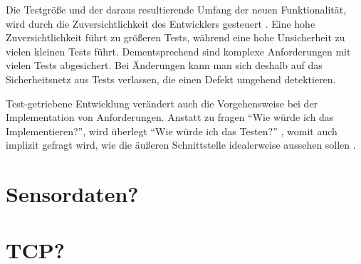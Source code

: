 Die Testgröße und der daraus resultierende Umfang der neuen Funktionalität, wird durch die Zuversichtlichkeit des Entwicklers gesteuert \cite[42]{tdd}.
Eine hohe Zuversichtlichkeit führt zu größeren Tests, während eine hohe Unsicherheit zu vielen kleinen Tests führt.
Dementsprechend sind komplexe Anforderungen mit vielen Tests abgesichert.
Bei Änderungen kann man sich deshalb auf das Sicherheitsnetz aus Tests verlassen, die einen Defekt umgehend detektieren.

Test-getriebene Entwicklung verändert auch die Vorgehensweise bei der Implementation von Anforderungen. Anstatt zu fragen \enquote{Wie würde ich das Implementieren?}, wird überlegt \enquote{Wie würde ich das Testen?} \cite[39]{tdd}, womit auch implizit gefragt wird, wie die äußeren Schnittstelle idealerweise aussehen sollen \cite[4]{tdd}.



	
	\section{Sensordaten?}
	
	\section{TCP?}
	
